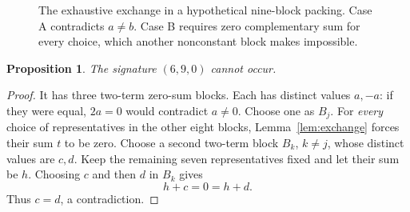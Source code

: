 \documentclass[11pt]{article}
\newtheorem{proposition}[theorem]{Proposition}
\theoremstyle{definition}
\theoremstyle{remark}
\begin{document}
\begin{figure}[htbp]
\centering
{}
\caption{The exhaustive exchange in a hypothetical nine-block packing.
Case A contradicts $a\neq b$. Case B requires zero complementary sum
for every choice, which another nonconstant block makes impossible.}
\label{fig:exchange}
\end{figure}

\begin{proposition}\label{prop:nine}
The signature $(6,9,0)$ cannot occur.
\end{proposition}
\begin{proof}
It has three two-term zero-sum blocks. Each has distinct values $a,-a$:
if they were equal, $2a=0$ would contradict $a\neq0$.
Choose one as $B_j$. For \emph{every} choice of representatives in the
other eight blocks, Lemma~\ref{lem:exchange} forces their sum $t$ to be
zero. Choose a second two-term block $B_k$, $k\neq j$, whose distinct
values are $c,d$. Keep the remaining seven representatives fixed and
let their sum be $h$. Choosing $c$ and then $d$ in $B_k$ gives
\[
                           h+c=0=h+d.
\]
Thus $c=d$, a contradiction.
\end{proof}
\end{document}
